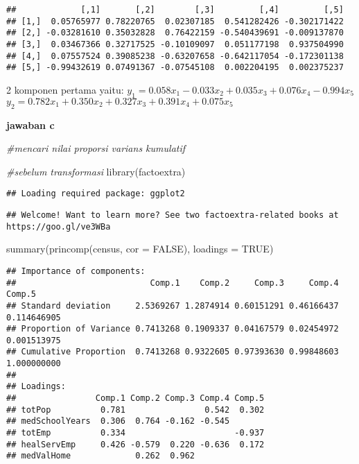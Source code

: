 \documentclass[
]{article}
\newenvironment{Shaded}{\begin{snugshade}}{\end{snugshade}}
\newcommand{\AttributeTok}[1]{\textcolor[rgb]{0.77,0.63,0.00}{#1}}
\newcommand{\CommentTok}[1]{\textcolor[rgb]{0.56,0.35,0.01}{\textit{#1}}}
\newcommand{\ConstantTok}[1]{\textcolor[rgb]{0.00,0.00,0.00}{#1}}
\newcommand{\FunctionTok}[1]{\textcolor[rgb]{0.00,0.00,0.00}{#1}}
\newcommand{\NormalTok}[1]{#1}
\begin{document}
\begin{verbatim}
##             [,1]       [,2]        [,3]         [,4]         [,5]
## [1,]  0.05765977 0.78220765  0.02307185  0.541282426 -0.302171422
## [2,] -0.03281610 0.35032828  0.76422159 -0.540439691 -0.009137870
## [3,]  0.03467366 0.32717525 -0.10109097  0.051177198  0.937504990
## [4,]  0.07557524 0.39085238 -0.63207658 -0.642117054 -0.172301138
## [5,] -0.99432619 0.07491367 -0.07545108  0.002204195  0.002375237
\end{verbatim}

2 komponen pertama yaitu:
\(y_{1} = 0.058x_{1} - 0.033x_{2} + 0.035x_{3} + 0.076x_{4} -0.994x_{5}\)
\(y_{2} = 0.782x_{1} + 0.350x_{2} + 0.327x_{3} + 0.391x_{4} + 0.075x_{5}\)

\textbf{jawaban c}

\begin{Shaded}
\begin{Highlighting}[]
\CommentTok{\#mencari nilai proporsi varians kumulatif}


\CommentTok{\#sebelum transformasi}
\FunctionTok{library}\NormalTok{(factoextra)}
\end{Highlighting}
\end{Shaded}

\begin{verbatim}
## Loading required package: ggplot2
\end{verbatim}

\begin{verbatim}
## Welcome! Want to learn more? See two factoextra-related books at https://goo.gl/ve3WBa
\end{verbatim}

\begin{Shaded}
\begin{Highlighting}[]
\FunctionTok{summary}\NormalTok{(}\FunctionTok{princomp}\NormalTok{(census, }\AttributeTok{cor =} \ConstantTok{FALSE}\NormalTok{), }\AttributeTok{loadings =} \ConstantTok{TRUE}\NormalTok{)}
\end{Highlighting}
\end{Shaded}

\begin{verbatim}
## Importance of components:
##                           Comp.1    Comp.2     Comp.3     Comp.4      Comp.5
## Standard deviation     2.5369267 1.2874914 0.60151291 0.46166437 0.114646905
## Proportion of Variance 0.7413268 0.1909337 0.04167579 0.02454972 0.001513975
## Cumulative Proportion  0.7413268 0.9322605 0.97393630 0.99848603 1.000000000
## 
## Loadings:
##                Comp.1 Comp.2 Comp.3 Comp.4 Comp.5
## totPop          0.781                0.542  0.302
## medSchoolYears  0.306  0.764 -0.162 -0.545       
## totEmp          0.334                      -0.937
## healServEmp     0.426 -0.579  0.220 -0.636  0.172
## medValHome             0.262  0.962
\end{verbatim}
\end{document}
